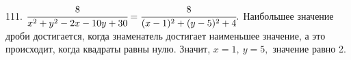 111. $\cfrac{8}{x^2+y^2-2x-10y+30}=\cfrac{8}{(x-1)^2+(y-5)^2+4}.$ Наибольшее значение дроби достигается, когда знаменатель достигает наименьшее значение, а это происходит, когда квадраты равны нулю. Значит, $x=1,\ y=5,$ значение равно 2.\\
